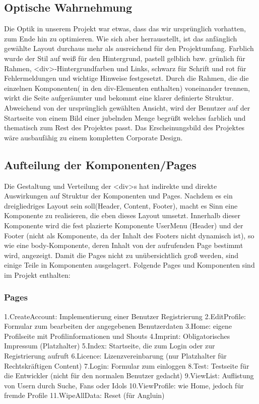 \subsection{Optische Wahrnehmung}
Die Optik in unserem Projekt war etwas, dass das wir ursprünglich vorhatten, zum Ende hin zu optimieren. Wie sich aber herrausstellt, ist das anfänglich gewählte Layout durchaus mehr als ausreichend für den Projektumfang. Farblich wurde der Stil auf weiß für den Hintergrund, pastell gelblich bzw. grünlich für Rahmen, <div>-Hintergrundfarben und Links, schwarz für Schrift und rot für Fehlermeldungen und wichtige Hinweise festgesetzt. Durch die Rahmen, die die einzelnen Komponenten( in den div-Elementen enthalten) voneinander trennen, wirkt die Seite aufgeräumter und bekommt eine klarer definierte Struktur. Abweichend von der ursprünglich gewählten Ansicht, wird der Benutzer auf der Startseite von einem Bild einer jubelnden Menge begrüßt welches farblich und thematisch zum Rest des Projektes passt. Das Erscheinungsbild des Projektes wäre ausbaufähig zu einem kompletten Corporate Design.

\subsection{Aufteilung der Komponenten/Pages}
Die Gestaltung und Verteilung der <div>s hat indirekte und direkte Auswirkungen auf Struktur der Komponenten und Pages. Nachdem es ein dreigliedriges Layout sein soll(Header, Content, Footer), macht es Sinn eine Komponente zu realisieren, die eben dieses Layout umsetzt. Innerhalb dieser Komponente wird die fest plazierte Komponente UserMenu (Header) und der Footer (nicht als Komponente, da der Inhalt des Footers nicht dynamisch ist), so wie eine body-Komponente, deren Inhalt von der aufrufenden Page bestimmt wird, angezeigt. Damit die Pages nicht zu unübersichtlich groß werden, sind einige Teile in Komponenten ausgelagert. Folgende Pages und Komponenten sind im Projekt enthalten:

\subsubsection{Pages}
1.CreateAccount: Implementierung einer Benutzer Registrierung
2.EditProfile: Formular zum bearbeiten der angegebenen Benutzerdaten
3.Home: eigene Profilseite mit Profilinformationen und Shouts
4.Imprint: Obligatorisches Impressum (Platzhalter)
5.Index: Startseite, die zum Login oder zur Registrierung aufruft
6.Licence: Lizenzvereinbarung (nur Platzhalter für Rechtskräftigen Content) 
7.Login: Formular zum einloggen
8.Test: Testseite für die Entwickler (nicht für den normalen Benutzer gedacht)
9.ViewList: Auflistung von Usern durch Suche, Fans oder Idols
10.ViewProfile: wie Home, jedoch für fremde Profile
11.WipeAllData: Reset (für Angluin)

